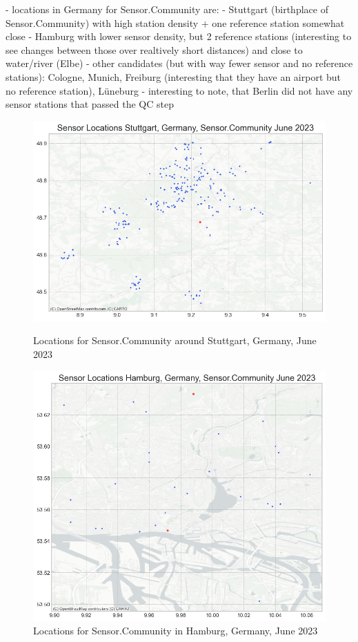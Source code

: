 - locations in Germany for Sensor.Community are:
  - Stuttgart (birthplace of Sensor.Community) with high station density + one reference station somewhat close
  - Hamburg with lower sensor density, but 2 reference stations (interesting to see changes between those over realtively short distances) and close to water/river (Elbe)
  - other candidates (but with way fewer sensor and no reference stations): Cologne, Munich, Freiburg (interesting that they have an airport but no reference station), Lüneburg
  - interesting to note, that Berlin did not have any sensor stations that passed the QC step\\

\begin{figure}[ht]
    \centering
    \includegraphics[width=1\textwidth]{images/sensor_community_locations_stuttgart_after_qc_june_23.png}
    \caption{Locations for Sensor.Community around Stuttgart, Germany, June 2023}
    \label{fig:qc sensor community stuttgart june 23}

    \includegraphics[width=1\textwidth]{images/sensor_community_locations_hamburg_after_qc_june_23.png}
    \caption{Locations for Sensor.Community in Hamburg, Germany, June 2023}
    \label{fig:qc sensor community hamburg june 23}
\end{figure}

